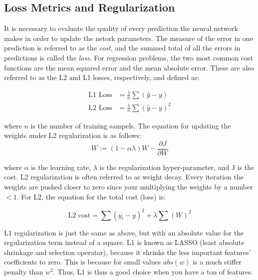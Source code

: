 \subsection{Loss Metrics and Regularization}
It is necessary to evaluate the quality of every prediction the neural network makes in order to update the netork parameters. The measure of the error in one prediction is referred to as the \textit{cost}, and the summed total of all the errors in predictions is called the \textit{loss}. For regression problems, the two most common cost functions are the mean squared error and the mean absolute error. These are also referred to as the L2 and L1 losses, respectively, and defined as:

\begin{align}
    \label{eqn:lossFunctions}
    \text{L1 Loss} &= \frac{1}{n} \sum \left( \hat{y} - y \right) \\
    \text{L2 Loss} &= \frac{1}{n} \sum \left( \hat{y} - y \right)^2
\end{align}

\noindent where $ n $ is the number of training sampels. The equation for updating the weights under L2 regularization is as follows:
\begin{equation}
    W := (1-\alpha \lambda)W - \frac{\partial J}{\partial W}  
\end{equation}

\noindent where $\alpha$ is the learning rate, $\lambda$ is the regularization hyper-parameter, and J is the cost. L2 regularization is often referred to as weight decay. Every iteration the weights are pushed closer to zero since your multiplying the weights by a number $<1$. For L2, the equation for the total cost (loss) is:

\begin{equation}
\text{L2 cost} = \sum (y_i - y)^2 + \lambda \sum (W)^2
\end{equation}

L1 regularization is just the same as above, but with an absolute value for the regularization term instead of a square. L1 is known as LASSO (least absolute shrinkage and selection operator), because it shrinks the less important features' coefficients to zero. This is because for small values $abs(w)$ is a much stiffer penalty than $w^2$. Thus, L1 is thus a good choice when you have a ton of features.




